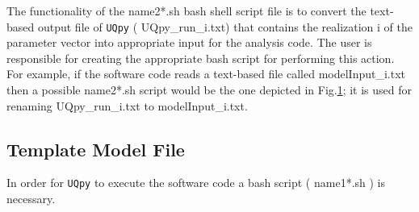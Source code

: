 \documentclass[preprint,12pt]{elsarticle}
\begin{document}
The functionality of the {\color{red} name2*.sh} bash shell script file is to convert the text-based output file of \texttt{UQpy}   ({\color{magenta} UQpy\_run\_i.txt}) that contains the realization {\color{magenta} i}  of the parameter vector into appropriate input  for the analysis code.  The user is responsible for creating the appropriate bash script for performing this action. For example, if the software code reads a text-based  file called {\color{magenta} modelInput\_i.txt} then a possible {\color{red} name2*.sh} script would be the one depicted in Fig.\ref{template_input};  it is used for renaming {\color{magenta} UQpy\_run\_i.txt } to {\color{magenta} modelInput\_i.txt}.


\begin{figure}[!ht]
	\caption{}
	\label{template_input}
\end{figure}



\subsection{Template Model File}

In order for \texttt{UQpy}  to execute the software code a bash script ({\color{red} name1*.sh} ) is necessary.  
\end{document}
